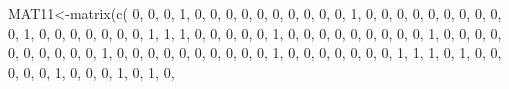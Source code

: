 \documentclass[
  notitlepage,
  onecolumn,
  openany]{book}
\newenvironment{Shaded}{\begin{snugshade}}{\end{snugshade}}
\newcommand{\DecValTok}[1]{\textcolor[rgb]{0.00,0.00,0.81}{#1}}
\newcommand{\FunctionTok}[1]{\textcolor[rgb]{0.00,0.00,0.00}{#1}}
\newcommand{\NormalTok}[1]{#1}
\newcommand{\OtherTok}[1]{\textcolor[rgb]{0.56,0.35,0.01}{#1}}
\begin{document}
\begin{Shaded}
\begin{Highlighting}[]
\NormalTok{MAT11}\OtherTok{\textless{}{-}}\FunctionTok{matrix}\NormalTok{(}\FunctionTok{c}\NormalTok{(}
\DecValTok{0}\NormalTok{, }\DecValTok{0}\NormalTok{, }\DecValTok{0}\NormalTok{, }\DecValTok{1}\NormalTok{, }\DecValTok{0}\NormalTok{, }\DecValTok{0}\NormalTok{, }\DecValTok{0}\NormalTok{, }\DecValTok{0}\NormalTok{, }\DecValTok{0}\NormalTok{, }\DecValTok{0}\NormalTok{, }\DecValTok{0}\NormalTok{,}
\DecValTok{0}\NormalTok{, }\DecValTok{0}\NormalTok{, }\DecValTok{0}\NormalTok{, }\DecValTok{1}\NormalTok{, }\DecValTok{0}\NormalTok{, }\DecValTok{0}\NormalTok{, }\DecValTok{0}\NormalTok{, }\DecValTok{0}\NormalTok{, }\DecValTok{0}\NormalTok{, }\DecValTok{0}\NormalTok{, }\DecValTok{0}\NormalTok{,}
\DecValTok{0}\NormalTok{, }\DecValTok{0}\NormalTok{, }\DecValTok{0}\NormalTok{, }\DecValTok{1}\NormalTok{, }\DecValTok{0}\NormalTok{, }\DecValTok{0}\NormalTok{, }\DecValTok{0}\NormalTok{, }\DecValTok{0}\NormalTok{, }\DecValTok{0}\NormalTok{, }\DecValTok{0}\NormalTok{, }\DecValTok{0}\NormalTok{,}
\DecValTok{1}\NormalTok{, }\DecValTok{1}\NormalTok{, }\DecValTok{1}\NormalTok{, }\DecValTok{0}\NormalTok{, }\DecValTok{0}\NormalTok{, }\DecValTok{0}\NormalTok{, }\DecValTok{0}\NormalTok{, }\DecValTok{0}\NormalTok{, }\DecValTok{1}\NormalTok{, }\DecValTok{0}\NormalTok{, }\DecValTok{0}\NormalTok{,}
\DecValTok{0}\NormalTok{, }\DecValTok{0}\NormalTok{, }\DecValTok{0}\NormalTok{, }\DecValTok{0}\NormalTok{, }\DecValTok{0}\NormalTok{, }\DecValTok{0}\NormalTok{, }\DecValTok{0}\NormalTok{, }\DecValTok{1}\NormalTok{, }\DecValTok{0}\NormalTok{, }\DecValTok{0}\NormalTok{, }\DecValTok{0}\NormalTok{,}
\DecValTok{0}\NormalTok{, }\DecValTok{0}\NormalTok{, }\DecValTok{0}\NormalTok{, }\DecValTok{0}\NormalTok{, }\DecValTok{0}\NormalTok{, }\DecValTok{0}\NormalTok{, }\DecValTok{0}\NormalTok{, }\DecValTok{1}\NormalTok{, }\DecValTok{0}\NormalTok{, }\DecValTok{0}\NormalTok{, }\DecValTok{0}\NormalTok{,}
\DecValTok{0}\NormalTok{, }\DecValTok{0}\NormalTok{, }\DecValTok{0}\NormalTok{, }\DecValTok{0}\NormalTok{, }\DecValTok{0}\NormalTok{, }\DecValTok{0}\NormalTok{, }\DecValTok{0}\NormalTok{, }\DecValTok{1}\NormalTok{, }\DecValTok{0}\NormalTok{, }\DecValTok{0}\NormalTok{, }\DecValTok{0}\NormalTok{,}
\DecValTok{0}\NormalTok{, }\DecValTok{0}\NormalTok{, }\DecValTok{0}\NormalTok{, }\DecValTok{0}\NormalTok{, }\DecValTok{1}\NormalTok{, }\DecValTok{1}\NormalTok{, }\DecValTok{1}\NormalTok{, }\DecValTok{0}\NormalTok{, }\DecValTok{1}\NormalTok{, }\DecValTok{0}\NormalTok{, }\DecValTok{0}\NormalTok{,}
\DecValTok{0}\NormalTok{, }\DecValTok{0}\NormalTok{, }\DecValTok{0}\NormalTok{, }\DecValTok{1}\NormalTok{, }\DecValTok{0}\NormalTok{, }\DecValTok{0}\NormalTok{, }\DecValTok{0}\NormalTok{, }\DecValTok{1}\NormalTok{, }\DecValTok{0}\NormalTok{, }\DecValTok{1}\NormalTok{, }\DecValTok{0}\NormalTok{,}

\end{Highlighting}
\end{Shaded}
\end{document}
